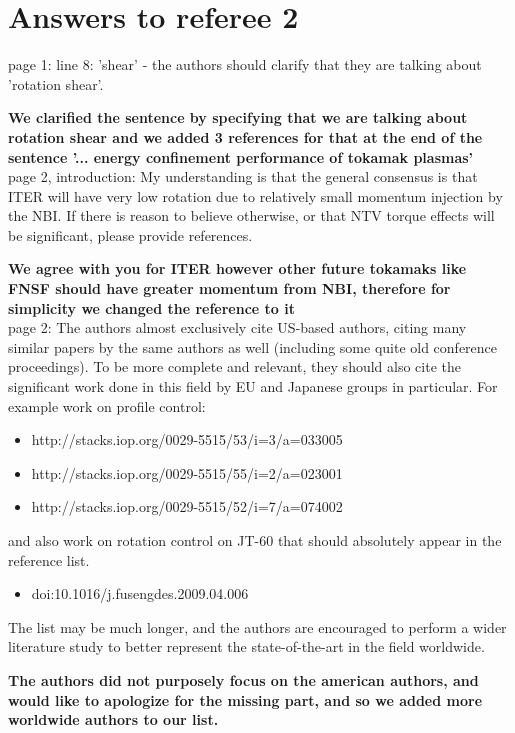 \documentclass{scrartcl}
\newcommand{\response}[1]{\textcolor{red!80!black}{\bf #1}}
\begin{document}
\section{Answers to referee 2}

page 1: line 8: 'shear' - the authors should clarify that they are talking about 'rotation shear'.

\response{We clarified the sentence by specifying that we are talking about rotation shear and we added 3 references for that at the end of the sentence { {'... energy confinement performance of tokamak plasmas'}} }\\

page 2, introduction: My understanding is that the general consensus is that ITER will have very low rotation due to relatively small momentum injection by the NBI. If there is reason to believe otherwise, or that NTV torque effects will be significant, please provide references.

\response{We agree with you for ITER however other future tokamaks like FNSF should have greater momentum from NBI, therefore for simplicity we changed the reference to it} \\


page 2: The authors almost exclusively cite US-based authors, citing many similar papers by the same authors as well (including some quite old conference proceedings). To be more complete and relevant, they should also cite the significant work done in this field by EU and Japanese groups in particular. For example work on profile control:
\begin{itemize}
\item http://stacks.iop.org/0029-5515/53/i=3/a=033005 
\item http://stacks.iop.org/0029-5515/55/i=2/a=023001 
\item http://stacks.iop.org/0029-5515/52/i=7/a=074002 
\end{itemize}
and also work on rotation control on JT-60 that should absolutely appear in the reference list.
\begin{itemize}
\item doi:10.1016/j.fusengdes.2009.04.006 
\end{itemize}
The list may be much longer, and the authors are encouraged to perform a wider literature study to better represent the state-of-the-art in the field worldwide.

\response{The authors did not purposely focus on the american authors, and would like to apologize for the missing part, and so we added more worldwide authors to our list.}\\
\end{document}

